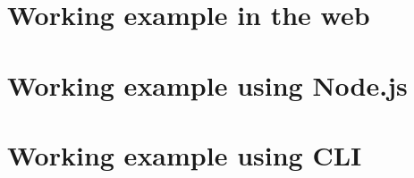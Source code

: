 \section{Working example in the web}

\section{Working example using Node.js}

\section{Working example using CLI}

